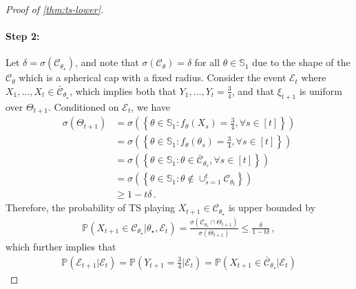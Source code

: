 \documentclass[letter, 12pt]{report}
\newcommand{\paren}[1]{\left( #1 \right)}
\newcommand{\cC}{\mathcal C}
\newcommand{\bS}{\mathbb S}
\newcommand{\1}{\mathbf{1}}
\newcommand{\mP}{\mathbb{P}}
\newcommand{\ts}{\textsc{TS}\xspace}
\theoremstyle{plain}
\theoremstyle{definition}
\theoremstyle{remark}
\begin{document}
\begin{proof}[Proof of \cref{thm:ts-lower}]
    \paragraph{Step 2:}
    Let $\delta = \sigma(\cC_{\theta_\star})$,
    and note that $\sigma(\cC_{\theta}) = \delta$ for all $\theta \in \bS_1$
    due to the shape of the $\cC_{\theta}$ which is a spherical cap with a
    fixed radius.
    Consider the event $\mathcal{E}_t$ where $X_1, \ldots, X_t \in \bar{\cC}_{\theta_\star}$,
    which implies both that $Y_1, \ldots, Y_t = \frac34$, and
    that $\xi_{t+1}$ is uniform over $\Theta_{t+1}$.
    Conditioned on $\mathcal{E}_t$, we have
    \begin{align*}
        \sigma(\Theta_{t+1})
         & =
        \sigma\paren{
            \left\{
            \theta \in \bS_1:
            f_\theta(X_s) = \frac34
            ,
            \forall s \in [t]
            \right\}
        }
        \\
         & =
        \sigma\paren{
            \left\{
            \theta \in \bS_1:
            f_\theta(\theta_s) = \frac34
            ,
            \forall s \in [t]
            \right\}
        }
        \\
         & =
        \sigma\paren{
            \left\{
            \theta \in \bS_1:
            \theta \in \bar{\cC}_{\theta_s}
            ,
            \forall s \in [t]
            \right\}
        }
        \\
         & =
        \sigma\paren{
            \left\{
            \theta \in \bS_1:
            \theta \notin
            \cup_{s=1}^t
            \cC_{\theta_t}
            \right\}
        }
        \\
         & \geq 1 - t \delta\,.
    \end{align*}
    Therefore, the probability of \ts{} playing $X_{t+1} \in \cC_{\theta_\star}$
    is upper bounded by
    \begin{align*}
        \mP(X_{t+1} \in \cC_{\theta_\star} |\theta_\star, \mathcal{E}_t)
        =
        \frac{
            \sigma(\cC_{\theta_\star} \cap \Theta_{t+1})
        }{
            \sigma(\Theta_{t+1})
        }
        \leq
        \frac{
            \delta
        }{
            1 - t \delta
        }\,,
    \end{align*}
    which further implies that
    \begin{align*}
        \mP(\mathcal{E}_{t+1} | \mathcal{E}_t)
        =
        \mP\paren{Y_{t+1} = \frac34 | \mathcal{E}_t}
        =
        \mP(X_{t+1} \in \bar{\cC}_{\theta_\star} | \mathcal{E}_t)

\end{align*}
\end{proof}
\end{document}
